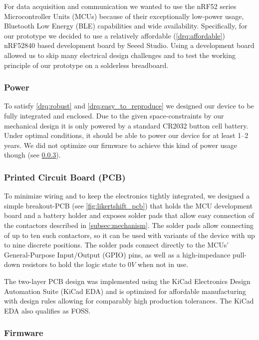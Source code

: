 For data acquisition and communication we wanted to use the nRF52 series Microcontroller Units (MCUs) because of their exceptionally low-power usage, Bluetooth Low Energy (BLE) capabilities and wide availability.
Specifically, for our prototype we decided to use a relatively affordable (\ref{drq:affordable}) nRF52840 based development board by Seeed Studio.
Using a development board allowed us to skip many electrical design challenges and to test the working principle of our prototype on a solderless breadboard.

\subsubsection{Power}

To satisfy \ref{drq:robust} and \ref{drq:easy_to_reproduce} we designed our device to be fully integrated and enclosed.
Due to the given space-constraints by our mechanical design it is only powered by a standard CR2032 button cell battery.
Under optimal conditions, it should be able to power our device for at least 1--2 years.
We did not optimize our firmware to achieve this kind of power usage though (see \ref{subsec:firmware}).

\subsubsection{Printed Circuit Board (PCB)}

To minimize wiring and to keep the electronics tightly integrated, we designed a simple breakout-PCB (see \autoref{fig:likertshift_pcb}) that holds the MCU development board and a battery holder and exposes solder pads that allow easy connection of the contactors described in \ref{subsec:mechanism}.
The solder pads allow connecting of up to ten such contactors, so it can be used with variants of the device with up to nine discrete positions.
The solder pads connect directly to the MCUs' General-Purpose Input/Output (GPIO) pins, as well as a high-impedance pull-down resistors to hold the logic state to $0V$ when not in use.

The two-layer PCB design was implemented using the KiCad Electronics Design Automation Suite (KiCad EDA) and is optimized for affordable manufacturing with design rules allowing for comparably high production tolerances.
The KiCad EDA also qualifies as FOSS.

\subsubsection{Firmware}\label{subsec:firmware}

